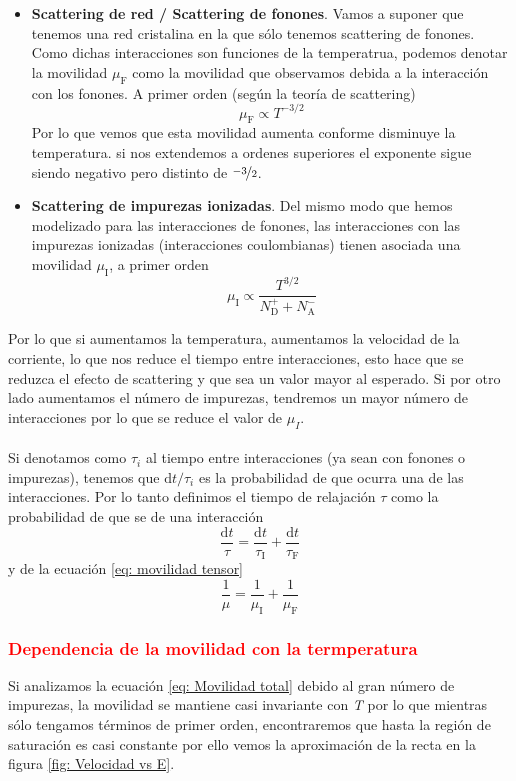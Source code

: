 \begin{itemize}
    \item \textbf{Scattering de red / Scattering de fonones}. Vamos a suponer que tenemos una red cristalina en la que sólo tenemos scattering de fonones. Como dichas interacciones son funciones de la temperatrua, podemos denotar la movilidad $\mu_\mathrm{F}$ como la movilidad que observamos debida a la interacción con los fonones. A primer orden (según la teoría de scattering)$$\mu_\mathrm{F} \propto T^{-3/2}$$ Por lo que vemos que esta movilidad aumenta conforme disminuye la temperatura. si nos extendemos a ordenes superiores el exponente sigue siendo negativo pero distinto de $\nicefrac{-3}{2}$. 
    \item \textbf{Scattering de impurezas ionizadas}. Del mismo modo que hemos modelizado para las interacciones de fonones, las interacciones con las impurezas ionizadas (interacciones coulombianas) tienen asociada una movilidad $\mu_\mathrm{I}$, a primer orden \begin{equation}
        \mu_\mathrm{I}\propto \frac{T^{3/2}}{N_\mathrm{D}^++N_\mathrm{A}^-}
    \end{equation} 
\end{itemize}
\noindent Por lo que si aumentamos la temperatura, aumentamos la velocidad de la corriente, lo que nos reduce el tiempo entre interacciones, esto hace que se reduzca el efecto de scattering y que sea un valor mayor al esperado. Si por otro lado aumentamos el número de impurezas, tendremos un mayor número de interacciones por lo que se reduce el valor de $\mu_I$.\\\\
Si denotamos como $\tau_i$ al tiempo entre interacciones (ya sean con fonones o impurezas), tenemos que $\mathrm{d}t/\tau_i$ es la probabilidad de que ocurra una de las interacciones. Por lo tanto definimos el tiempo de relajación $\tau$ como la probabilidad de que se de una interacción $$\frac{\mathrm{d}t}{\tau}=\frac{\mathrm{d}t}{\tau_\mathrm{I}}+\frac{\mathrm{d}t}{\tau_\mathrm{F}}$$ y de la ecuación \ref{eq: movilidad tensor}
\begin{equation}
    \frac{1}{\mu}=\frac{1}{\mu_\mathrm{I}}+\frac{1}{\mu_\mathrm{F}}
    \label{eq: Movilidad total}
\end{equation}
\subsubsection{\textcolor{red}{Dependencia de la movilidad con la termperatura}}
Si analizamos la ecuación \ref{eq: Movilidad total} debido al gran número de impurezas, la movilidad se mantiene casi invariante con \textit{T} por lo que mientras sólo tengamos términos de primer orden, encontraremos que hasta la región de saturación es casi constante por ello vemos la aproximación de la recta en la figura \ref{fig: Velocidad vs E}.

